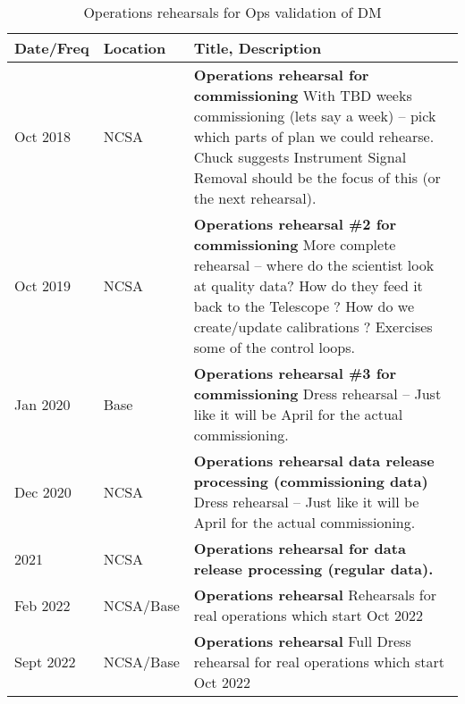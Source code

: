 \begin{longtable} {|l|l|p{}|}
	\caption{Operations rehearsals for Ops validation of DM \label{tab:ors}}\\  %
	\hline
\textbf{Date/Freq} &\textbf{Location}& \textbf{Title, Description} \\ \hline

Oct 2018 &  NCSA & \textbf{Operations rehearsal for commissioning }
	With TBD weeks commissioning (lets say a week) -- pick which parts of plan we could rehearse.
	Chuck suggests Instrument Signal Removal should be the focus of this (or the next rehearsal).
	\\ \hline
Oct 2019 & NCSA &  \textbf{Operations rehearsal \#2 for commissioning}
More complete rehearsal -- where do the scientist look at quality data? How do they feed it back to the Telescope ?
How do we create/update calibrations ? Exercises some of the control loops.
\\ \hline
Jan 2020 & Base  &  \textbf{Operations rehearsal \#3 for commissioning}
Dress rehearsal -- Just like it will be April for the actual commissioning.
	\\ \hline
Dec 2020 &  NCSA &  \textbf{Operations rehearsal data release processing (commissioning data)}
	Dress rehearsal -- Just like it will be April for the actual commissioning.
	\\ \hline

2021 &  NCSA &  \textbf{Operations rehearsal for data release processing (regular data).}
	\\ \hline

Feb 2022 &  NCSA/Base &  \textbf{Operations rehearsal}
Rehearsals for real operations which start Oct 2022
	\\ \hline
Sept 2022 &  NCSA/Base &  \textbf{Operations rehearsal}
Full Dress rehearsal for real operations which start Oct 2022
	\\ \hline


\end{longtable}
